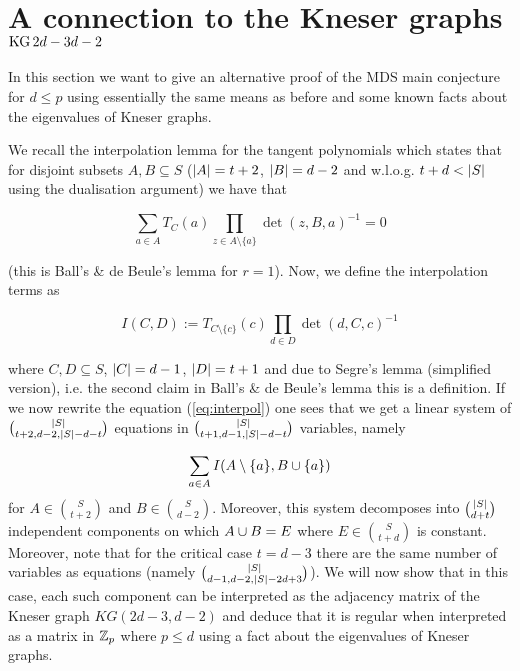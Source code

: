 \documentclass[a4paper]{article}
\begin{document}
\section{A connection to the Kneser graphs $\mathop\mathrm{KG}{2d-3}{d-2}$}

In this section we want to give an alternative proof of the MDS main conjecture for $d\leq p$ using essentially the same means as before and some known facts about the eigenvalues of Kneser graphs.

We recall the interpolation lemma for the tangent polynomials which states that for disjoint subsets $A,B\subseteq S$ ($\left|A\right|=t+2$, $\left|B\right|=d-2$ and w.l.o.g. $t+d < \left|S\right|$ using the dualisation argument)
we have that

\begin{equation}
  \sum_{a\in A}{T_C(a)\prod_{z\in A\setminus \{a\}}\det(z,B,a)^{-1}}=0\label{eq:interpol}
\end{equation}

(this is Ball's \& de Beule's lemma for $r=1$). Now, we define the interpolation terms as

\begin{equation}
  I(C,D):=T_{C\setminus\{c\}}(c)\prod_{d\in D}\det(d,C,c)^{-1}
\end{equation}

where $C,D\subseteq S$, $\left|C\right|=d-1$, $\left|D\right|=t+1$ and due to Segre's lemma (simplified version), i.e. the second claim in Ball's \& de Beule's lemma this is a definition.
If we now rewrite the equation (\ref{eq:interpol}) one sees that we get a linear system of $\binom{\card{S}}{t+2,d-2,|S|-d-t}$ equations in $\binom{\card{S}}{t+1,d-1,|S|-d-t}$ variables, namely

\begin{equation}
  \sum_{a\in A}{I(A\setminus\{a\}, B\cup\{a\})}\label{eq:linsys}
\end{equation}
for $A\in\binom{S}{t+2}$ and $B\in\binom{S}{d-2}$. Moreover, this system decomposes into $\binom{\card{S}}{d+t}$ independent components on which $A\cup B=E$ where $E\in\binom{S}{t+d}$ is constant.
Moreover, note that for the critical case $t=d-3$ there are the same number of variables as equations (namely $\binom{\card{S}}{d-1,d-2,\card{S}-2d+3}$).
We will now show that in this case, each such component can be interpreted as the adjacency matrix of the Kneser graph $KG(2d-3,d-2)$ and deduce that it is regular when interpreted as a matrix in $\mathbb{Z}_p$ where $p\leq d$ using a fact about the eigenvalues of Kneser graphs.
\end{document}
